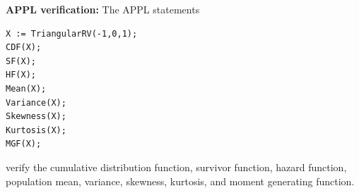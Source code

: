 \documentclass[12pt,fullpage]{article}
\begin{document}
\vspace{0.1in}

\noindent
{\bf APPL verification:}
The APPL statements
\begin{verbatim}
X := TriangularRV(-1,0,1);
CDF(X);
SF(X);
HF(X);
Mean(X);
Variance(X);
Skewness(X);
Kurtosis(X);
MGF(X);
\end{verbatim}
verify the cumulative distribution function, survivor function, hazard function, population mean, variance, skewness, kurtosis, and moment generating function.
\end{document}
